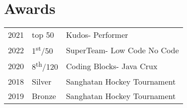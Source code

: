 \documentclass[]{deedy-resume-openfont}
\begin{document}
\begin{minipage}[t]{0.33\textwidth}
\section{Awards} 
\begin{tabular}{rll}
2021	     & top 50  &Kudos- Performer\\
2022	     & 1\textsuperscript{st}/50  & SuperTeam- Low Code No Code\\
2020         & 8\textsuperscript{th}/120  & Coding Blocks- Java Crux\\
2018        & Silver  & Sanghatan Hockey Tournament\\
2019         & Bronze  & Sanghatan Hockey Tournament

\end{tabular}

\sectionsep

\end{minipage}

 
\end{document}
